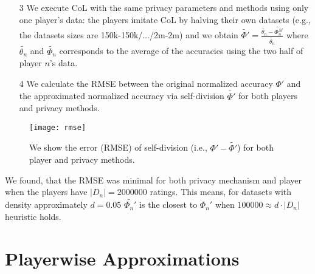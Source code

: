 \documentclass[USenglish,oneside,twocolumn]{article}
\theoremstyle{plain}
\begin{document}
\begin{appendices}
\begin{itemize}
            \item[3] We execute CoL with the same privacy parameters and methods using only one player's data: the players imitate CoL by halving their own datasets (e.g., the datasets sizes are 150k-150k/$\dots$/2m-2m) and we obtain $\widetilde{\Phi'}=\frac{\widetilde{\theta_n}-\widetilde{\Phi_n^M}}{\widetilde{\theta_n}}$ where $\widetilde{\theta_n}$ and $\widetilde{\Phi_n}$ corresponds to the average of the accuracies using the two half of player $n$'s data.
            
            \item[4] We calculate the RMSE between the original normalized accuracy $\Phi'$ and the approximated normalized accuracy via self-division $\widetilde{\Phi'}$ for both players and privacy methods. 
        \end{itemize}
        
        \nopagebreak
        
        \begin{figure}[h]
            \centering
            \texttt{[image: rmse]}
            \caption{We show the error (RMSE) of self-division (i.e., $\Phi'-\widetilde{\Phi'}$) for both player and privacy methods. }
            \label{fig:rmse}
        \end{figure}
        
        We found, that the RMSE was minimal for both privacy mechanism and player when the players have $|D_n|=\num{2000000}$ ratings. This means, for datasets with density approximately $d=0.05$ $\widetilde{\Phi_n'}$ is the closest to $\Phi_n'$ when $\num{100000}\approx d\cdot|D_n|$ heuristic holds.
        
        
        
        \pagebreak
        \section{Playerwise Approximations}
        \label{app:excel}
        

\end{appendices}
\end{document}
